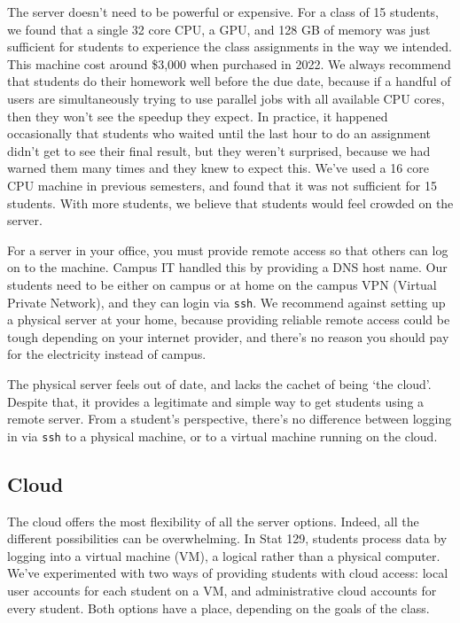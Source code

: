 \documentclass[12pt]{article}
\begin{document}
The server doesn't need to be powerful or expensive.
For a class of 15 students, we found that a single 32 core CPU, a GPU, and 128 GB of memory was just sufficient for students to experience the class assignments in the way we intended.
This machine cost around \$3,000 when purchased in 2022.
We always recommend that students do their homework well before the due date, because if a handful of users are simultaneously trying to use parallel jobs with all available CPU cores, then they won't see the speedup they expect.
In practice, it happened occasionally that students who waited until the last hour to do an assignment didn't get to see their final result, but they weren't surprised, because we had warned them many times and they knew to expect this.
We've used a 16 core CPU machine in previous semesters, and found that it was not sufficient for 15 students.
With more students, we believe that students would feel crowded on the server.

For a server in your office, you must provide remote access so that others can log on to the machine.
Campus IT handled this by providing a DNS host name.
Our students need to be either on campus or at home on the campus VPN (Virtual Private Network), and they can login via \texttt{ssh}.
We recommend against setting up a physical server at your home, because providing reliable remote access could be tough depending on your internet provider, and there's no reason you should pay for the electricity instead of campus.

The physical server feels out of date, and lacks the cachet of being `the cloud'.
Despite that, it provides a legitimate and simple way to get students using a remote server.
From a student's perspective, there's no difference between logging in via \texttt{ssh} to a physical machine, or to a virtual machine running on the cloud.

\subsection{Cloud}

The cloud offers the most flexibility of all the server options.
Indeed, all the different possibilities can be overwhelming.
In Stat 129, students process data by logging into a virtual machine (VM), a logical rather than a physical computer.
We've experimented with two ways of providing students with cloud access: local user accounts for each student on a VM, and administrative cloud accounts for every student.
Both options have a place, depending on the goals of the class.
\end{document}
